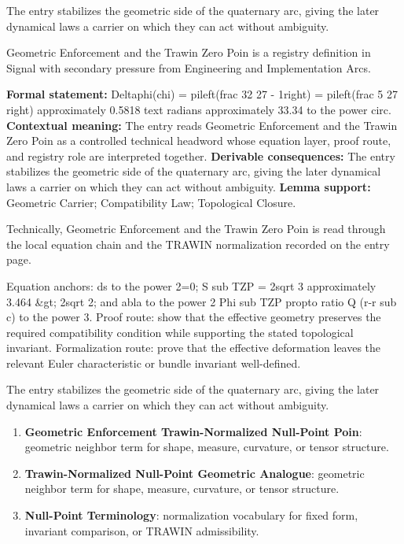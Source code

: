 The entry stabilizes the geometric side of the quaternary arc, giving the later dynamical laws a carrier on which they can act without ambiguity.
\clearpage


\begingroup\small
{}
Geometric Enforcement and the Trawin Zero Poin is a registry definition in Signal with secondary pressure from Engineering and Implementation Arcs.

\begingroup\footnotesize\setlength{\emergencystretch}{3em}\sloppy
\textbf{Formal statement:} Deltaphi(chi) = pileft(frac 32 27 - 1right) = pileft(frac 5 27 right) approximately 0.5818 text radians approximately 33.34 to the power circ. \textbf{Contextual meaning:} The entry reads Geometric Enforcement and the Trawin Zero Poin as a controlled technical headword whose equation layer, proof route, and registry role are interpreted together. \textbf{Derivable consequences:} The entry stabilizes the geometric side of the quaternary arc, giving the later dynamical laws a carrier on which they can act without ambiguity. \textbf{Lemma support:} Geometric Carrier; Compatibility Law; Topological Closure.\par
\endgroup

Technically, Geometric Enforcement and the Trawin Zero Poin is read through the local equation chain and the TRAWIN normalization recorded on the entry page.

Equation anchors: ds to the power 2=0; S sub TZP = 2sqrt 3 approximately 3.464 \&gt; 2sqrt 2; and abla to the power 2 Phi sub TZP propto ratio Q (r-r sub c) to the power 3. Proof route: show that the effective geometry preserves the required compatibility condition while supporting the stated topological invariant. Formalization route: prove that the effective deformation leaves the relevant Euler characteristic or bundle invariant well-defined.

The entry stabilizes the geometric side of the quaternary arc, giving the later dynamical laws a carrier on which they can act without ambiguity.
\endgroup

\begin{enumerate}[leftmargin=1.6em,itemsep=6pt,topsep=4pt]
\item \textbf{Geometric Enforcement Trawin-Normalized Null-Point Poin}: geometric neighbor term for shape, measure, curvature, or tensor structure.
\item \textbf{Trawin-Normalized Null-Point Geometric Analogue}: geometric neighbor term for shape, measure, curvature, or tensor structure.
\item \textbf{Null-Point Terminology}: normalization vocabulary for fixed form, invariant comparison, or TRAWIN admissibility.
\end{enumerate}

